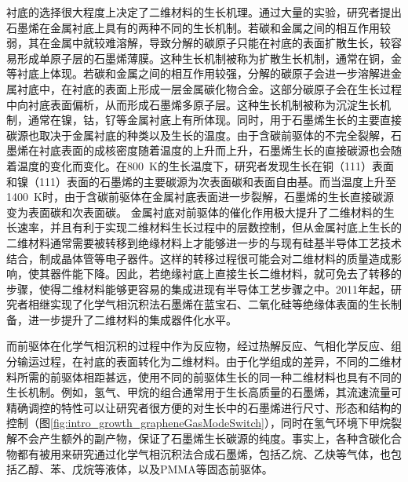     衬底的选择很大程度上决定了二维材料的生长机理。通过大量的实验，研究者提出石墨烯在金属衬底上具有的两种不同的生长机制。若碳和金属之间的相互作用较弱，其在金属中就较难溶解，导致分解的碳原子只能在衬底的表面扩散生长，较容易形成单原子层的石墨烯薄膜。这种生长机制被称为扩散生长机制，通常在铜，金等衬底上体现。若碳和金属之间的相互作用较强，分解的碳原子会进一步溶解进金属衬底中，在衬底的表面上形成一层金属碳化物合金。这部分碳原子会在生长过程中向衬底表面偏析，从而形成石墨烯多原子层。这种生长机制被称为沉淀生长机制，通常在镍，钴，钌等金属衬底上有所体现。同时，用于石墨烯生长的主要直接碳源也取决于金属衬底的种类以及生长的温度。由于含碳前驱体的不完全裂解，石墨烯在衬底表面的成核密度随着温度的上升而上升，石墨烯生长的直接碳源也会随着温度的变化而变化。在\SI{800}{\kelvin}的生长温度下，研究者发现生长在铜（111）表面和镍（111）表面的石墨烯的主要碳源为次表面碳和表面自由基。而当温度上升至\SI{1400}{\kelvin}时，由于含碳前驱体在金属衬底表面进一步裂解，石墨烯的生长直接碳源变为表面碳和次表面碳。
    金属衬底对前驱体的催化作用极大提升了二维材料的生长速率，并且有利于实现二维材料生长过程中的层数控制，但从金属衬底上生长的二维材料通常需要被转移到绝缘材料上才能够进一步的与现有硅基半导体工艺技术结合，制成晶体管等电子器件。这样的转移过程很可能会对二维材料的质量造成影响，使其器件能下降。因此，若绝缘衬底上直接生长二维材料，就可免去了转移的步骤，使得二维材料能够更容易的集成进现有半导体工艺步骤之中。2011年起，研究者相继实现了化学气相沉积法石墨烯在蓝宝石、二氧化硅等绝缘体表面的生长制备，进一步提升了二维材料的集成器件化水平。

    而前驱体在化学气相沉积的过程中作为反应物，经过热解反应、气相化学反应、组分输运过程，在衬底的表面转化为二维材料。由于化学组成的差异，不同的二维材料所需的前驱体相距甚远，使用不同的前驱体生长的同一种二维材料也具有不同的生长机制。例如，氢气、甲烷的组合通常用于生长高质量的石墨烯，其流速流量可精确调控的特性可以让研究者很方便的对生长中的石墨烯进行尺寸、形态和结构的控制（图\ref{fig:intro_growth_grapheneGasModeSwitch}），同时在氢气环境下甲烷裂解不会产生额外的副产物，保证了石墨烯生长碳源的纯度。事实上，各种含碳化合物都有被用来研究通过化学气相沉积法合成石墨烯，包括乙烷、乙炔等气体，也包括乙醇、苯、戊烷等液体，以及PMMA等固态前驱体。

